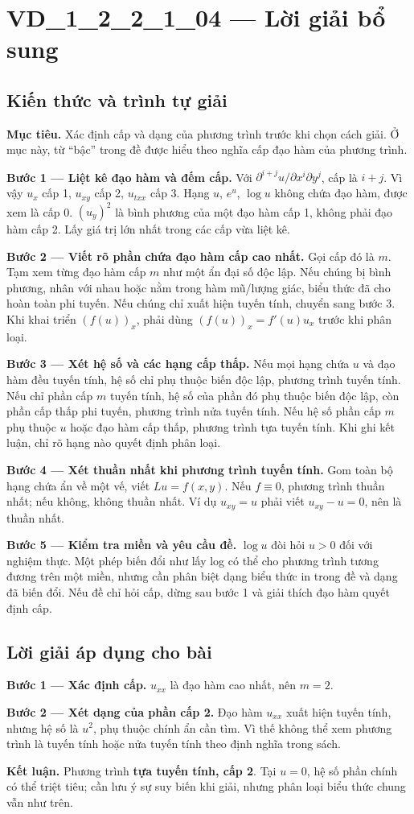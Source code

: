 \documentclass[10pt,a4paper]{article}
\begin{document}
\section*{VD\_1\_2\_2\_1\_04 — Lời giải bổ sung}
\subsection*{Kiến thức và trình tự giải}
\textbf{Mục tiêu.} Xác định cấp và dạng của phương trình trước khi chọn cách giải. Ở mục này, từ “bậc” trong đề được hiểu theo nghĩa cấp đạo hàm của phương trình.

\textbf{Bước 1 — Liệt kê đạo hàm và đếm cấp.} Với $\partial^{i+j}u/\partial x^i\partial y^j$, cấp là $i+j$. Vì vậy $u_x$ cấp 1, $u_{xy}$ cấp 2, $u_{txx}$ cấp 3. Hạng $u$, $e^u$, $\log u$ không chứa đạo hàm, được xem là cấp 0. $(u_y)^2$ là bình phương của một đạo hàm cấp 1, không phải đạo hàm cấp 2. Lấy giá trị lớn nhất trong các cấp vừa liệt kê.

\textbf{Bước 2 — Viết rõ phần chứa đạo hàm cấp cao nhất.} Gọi cấp đó là $m$. Tạm xem từng đạo hàm cấp $m$ như một ẩn đại số độc lập. Nếu chúng bị bình phương, nhân với nhau hoặc nằm trong hàm mũ/lượng giác, biểu thức đã cho hoàn toàn phi tuyến. Nếu chúng chỉ xuất hiện tuyến tính, chuyển sang bước 3. Khi khai triển $(f(u))_x$, phải dùng $(f(u))_x=f'(u)u_x$ trước khi phân loại.

\textbf{Bước 3 — Xét hệ số và các hạng cấp thấp.} Nếu mọi hạng chứa $u$ và đạo hàm đều tuyến tính, hệ số chỉ phụ thuộc biến độc lập, phương trình tuyến tính. Nếu chỉ phần cấp $m$ tuyến tính, hệ số của phần đó phụ thuộc biến độc lập, còn phần cấp thấp phi tuyến, phương trình nửa tuyến tính. Nếu hệ số phần cấp $m$ phụ thuộc $u$ hoặc đạo hàm cấp thấp, phương trình tựa tuyến tính. Khi ghi kết luận, chỉ rõ hạng nào quyết định phân loại.

\textbf{Bước 4 — Xét thuần nhất khi phương trình tuyến tính.} Gom toàn bộ hạng chứa ẩn về một vế, viết $Lu=f(x,y)$. Nếu $f\equiv0$, phương trình thuần nhất; nếu không, không thuần nhất. Ví dụ $u_{xy}=u$ phải viết $u_{xy}-u=0$, nên là thuần nhất.

\textbf{Bước 5 — Kiểm tra miền và yêu cầu đề.} $\log u$ đòi hỏi $u>0$ đối với nghiệm thực. Một phép biến đổi như lấy log có thể cho phương trình tương đương trên một miền, nhưng cần phân biệt dạng biểu thức in trong đề và dạng đã biến đổi. Nếu đề chỉ hỏi cấp, dừng sau bước 1 và giải thích đạo hàm quyết định cấp.
\subsection*{Lời giải áp dụng cho bài}
\textbf{Bước 1 — Xác định cấp.} $u_{xx}$ là đạo hàm cao nhất, nên $m=2$.

\textbf{Bước 2 — Xét dạng của phần cấp 2.} Đạo hàm $u_{xx}$ xuất hiện tuyến tính, nhưng hệ số là $u^2$, phụ thuộc chính ẩn cần tìm. Vì thế không thể xem phương trình là tuyến tính hoặc nửa tuyến tính theo định nghĩa trong sách.

\textbf{Kết luận.} Phương trình \textbf{tựa tuyến tính, cấp 2}. Tại $u=0$, hệ số phần chính có thể triệt tiêu; cần lưu ý sự suy biến khi giải, nhưng phân loại biểu thức chung vẫn như trên.
\end{document}
